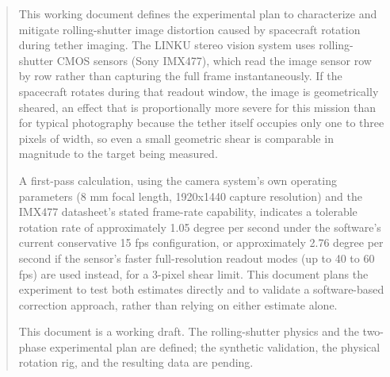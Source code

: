 \documentclass[a4paper, twoside]{report}
\begin{document}


\begin{abstract}
This working document defines the experimental plan to characterize and mitigate rolling-shutter image distortion caused by spacecraft rotation during tether imaging. The LINKU stereo vision system uses rolling-shutter CMOS sensors (Sony IMX477), which read the image sensor row by row rather than capturing the full frame instantaneously. If the spacecraft rotates during that readout window, the image is geometrically sheared, an effect that is proportionally more severe for this mission than for typical photography because the tether itself occupies only one to three pixels of width, so even a small geometric shear is comparable in magnitude to the target being measured.

A first-pass calculation, using the camera system's own operating parameters (8 mm focal length, 1920x1440 capture resolution) and the IMX477 datasheet's stated frame-rate capability, indicates a tolerable rotation rate of approximately 1.05 degree per second under the software's current conservative 15 fps configuration, or approximately 2.76 degree per second if the sensor's faster full-resolution readout modes (up to 40 to 60 fps) are used instead, for a 3-pixel shear limit. This document plans the experiment to test both estimates directly and to validate a software-based correction approach, rather than relying on either estimate alone.

This document is a working draft. The rolling-shutter physics and the two-phase experimental plan are defined; the synthetic validation, the physical rotation rig, and the resulting data are pending.
\end{abstract}

\tableofcontents
\listoffigures
\listoftables










\end{document}

